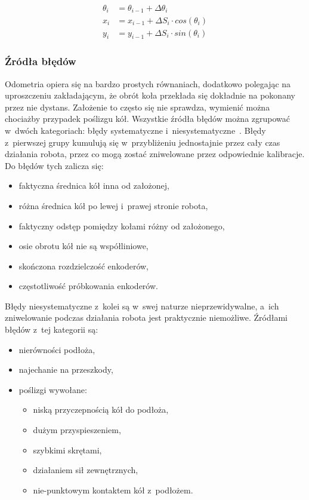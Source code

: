 \begin{align*}
\theta_i &= \theta_{i-1} + \Delta \theta_i \\
x_i &= x_{i-1} + \Delta S_i \cdot cos(\theta_i) \\
y_i &= y_{i-1} + \Delta S_i \cdot sin(\theta_i)
\end{align*}


\subsubsection{Źródła błędów}

Odometria opiera się na bardzo prostych równaniach, dodatkowo polegając na
uproszczeniu zakładającym, że obrót koła przekłada się dokładnie na pokonany
przez nie dystans. Założenie to często się nie sprawdza, wymienić można
chociażby przypadek poślizgu kół. Wszystkie źródła błędów można zgrupować
w~dwóch kategoriach: błędy systematyczne i~niesystematyczne~\cite{whereami}.
Błędy z~pierwszej grupy kumulują się w~przybliżeniu jednostajnie przez cały czas
działania robota, przez co mogą zostać zniwelowane przez odpowiednie kalibracje.
Do błędów tych zalicza się:
\begin{itemize}
  \item faktyczna średnica kół inna od założonej,
  \item różna średnica kół po lewej i~prawej stronie robota,
  \item faktyczny odstęp pomiędzy kołami różny od założonego,
  \item osie obrotu kół nie są współliniowe,
  \item skończona rozdzielczość enkoderów,
  \item częstotliwość próbkowania enkoderów.
\end{itemize}

Błędy niesystematyczne z~kolei są w~swej naturze nieprzewidywalne, a~ich
zniwelowanie podczas działania robota jest praktycznie niemożliwe. Źródłami
błędów z~tej kategorii są:
\begin{itemize}
  \item nierówności podłoża,
  \item najechanie na przeszkody,
  \item poślizgi wywołane:
  \begin{itemize}
    \item niską przyczepnością kół do podłoża,
    \item dużym przyspieszeniem,
    \item szybkimi skrętami,
    \item działaniem sił zewnętrznych,
    \item nie-punktowym kontaktem kół z~podłożem.
  \end{itemize}
\end{itemize}

